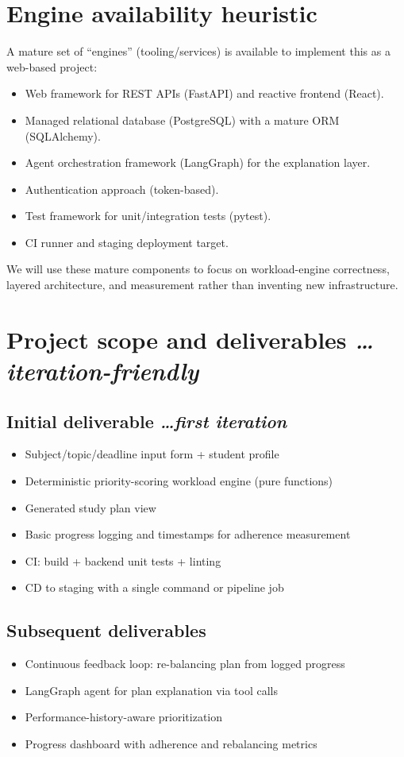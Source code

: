 \documentclass[11pt,a4paper]{article}
\newcommand{\BvrHint}[1]{%
  {\normalfont\normalsize\itshape\hfill #1}}
\begin{document}
\section{Engine availability heuristic}
A mature set of ``engines'' (tooling/services) is available to
implement this as a web-based project:
\begin{itemize}[leftmargin=0.7cm]
    \item Web framework for REST APIs (FastAPI) and reactive frontend (React).
    \item Managed relational database (PostgreSQL) with a mature ORM (SQLAlchemy).
    \item Agent orchestration framework (LangGraph) for the explanation layer.
    \item Authentication approach (token-based).
    \item Test framework for unit/integration tests (pytest).
    \item CI runner and staging deployment target.
\end{itemize}
We will use these mature components to focus on workload-engine
correctness, layered architecture, and measurement rather than
inventing new infrastructure.

\section{Project scope and deliverables %
\BvrHint{\ldots iteration-friendly}}
\subsection{Initial deliverable %
\BvrHint{\ldots first iteration}}
\begin{itemize}[leftmargin=0.7cm]
    \item Subject/topic/deadline input form + student profile
    \item Deterministic priority-scoring workload engine (pure functions)
    \item Generated study plan view
    \item Basic progress logging and timestamps for adherence measurement
    \item CI: build + backend unit tests + linting
    \item CD to staging with a single command or pipeline job
\end{itemize}

\subsection{Subsequent deliverables}
\begin{itemize}[leftmargin=0.7cm]
    \item Continuous feedback loop: re-balancing plan from logged progress
    \item LangGraph agent for plan explanation via tool calls
    \item Performance-history-aware prioritization
    \item Progress dashboard with adherence and rebalancing metrics
\end{itemize}
\end{document}
